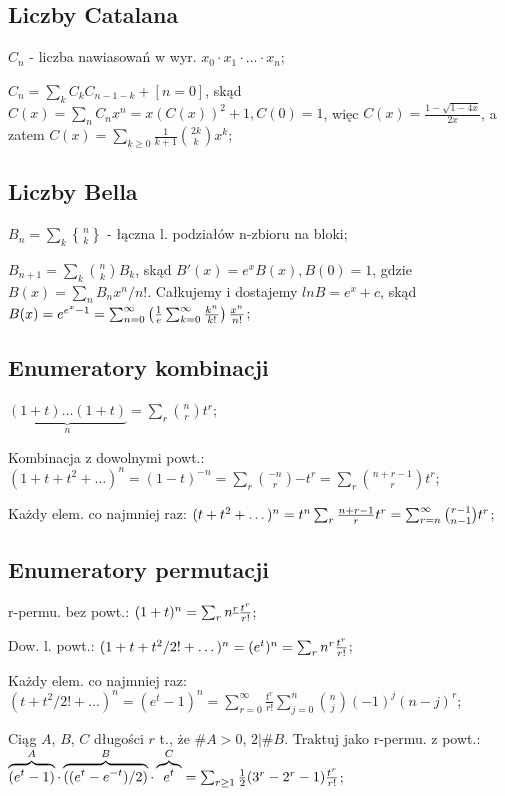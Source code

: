 \subsection{Liczby Catalana}

$C_n$ - liczba nawiasowań w wyr. $x_0 \cdot x_1 \cdot \dots \cdot x_n$;

$C_n = \sum_kC_kC_{n-1-k} + [n=0]$,
  skąd $C(x) = \sum_n C_nx^n = x(C(x))^2 + 1, C(0) = 1$,
  więc $C(x) = \frac{1 - \sqrt{1-4x}}{2x}$, a zatem $C(x) =
  \sum_{k\geq 0} \frac{1}{k+1}\binom{2k}{k}x^k$;

\subsection{Liczby Bella}

${B_n = \sum_k{n \brace k}}$ - łączna l. podziałów n-zbioru na bloki;

${B_{n+1} = \sum_k \binom{n}{k} B_k}$, skąd $B'(x) = e^xB(x), B(0) = 1$,
  gdzie $B(x) = \sum_n B_nx^n/n!$. Całkujemy i dostajemy $ln B = e^x + c$,
  skąd $B(x) = e^{e^x-1} =
  \sum_{n=0}^\infty \left ( {1 \over e} \sum_{k=0}^\infty {k^n \over k!}\right)
  {x^n \over n!}$;

\subsection{Enumeratory kombinacji}

$\underbrace{(1+t)\dots(1+t)}_n = \sum_r\binom{n}{r}t^r$;

Kombinacja z dowolnymi powt.: $(1+t+t^2+\dots)^n=(1-t)^{-n}=
  \sum_r\binom{-n}{r}{-t}^r=\sum_r\binom{n+r-1}{r}t^r$;

Każdy elem. co najmniej raz: $(t+t^2+\dots)^n = t^n\sum_r {n+r-1 \over r}t^r =
  \sum^\infty_{r=n}\binom{r-1}{n-1}t^r$;

\subsection{Enumeratory permutacji}

r-permu. bez powt.: $(1+t)^n = \sum_rn^{\underline{r}}{t^r \over r!}$;

Dow. l. powt.: ${(1+t+t^2/2! + \dots)^n} = {(e^{t})^n} =
  {\sum_rn^r{t^r \over r!}}$;

Każdy elem. co najmniej raz: $(t + t^2/2! + \dots)^n = (e^t - 1)^n =
  \sum^\infty_{r=0}\frac{t^r}{r!}\sum^n_{j=0}\binom{n}{j}(-1)^j(n-j)^r$;

Ciąg $A$, $B$, $C$ długości $r$ t., że $\#A>0$, $2|\#B$. Traktuj jako r-permu.
  z powt.:
  $\overbrace{(e^t - 1)}^A\cdot\overbrace{((e^t - e^{-t})/2)}^B
  \cdot\overbrace{e^t}^C =
  \sum_{r \geq 1} {1 \over 2}(3^r - 2^r - 1){t^r \over r!}$;
